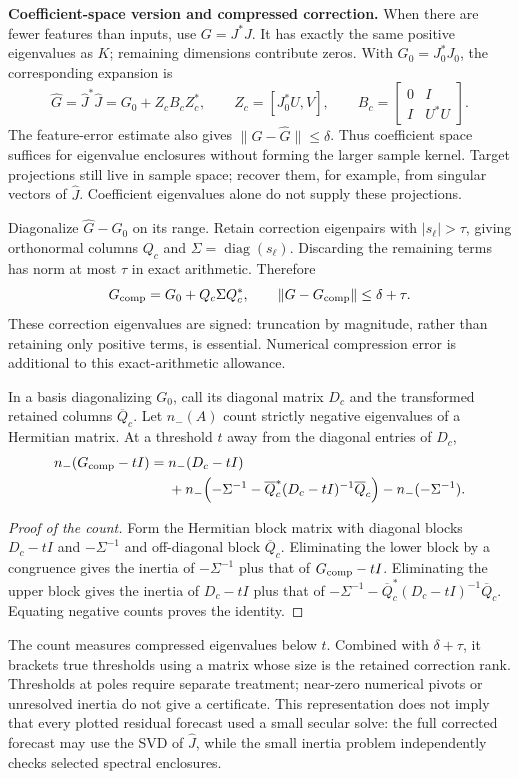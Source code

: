 \documentclass[11pt]{article}
\DeclareMathOperator{\diag}{diag}
\theoremstyle{definition}
\begin{document}
\textbf{Coefficient-space version and compressed correction.}
When there are fewer features than inputs, use $G=J^*J$. It has exactly
the same positive eigenvalues as $K$; remaining dimensions contribute zeros.
With $G_0=J_0^*J_0$, the corresponding expansion is
\[
\widehat G=\widehat J^*\widehat J=G_0+Z_cB_cZ_c^*,\qquad
Z_c=[J_0^*U,V],\qquad
B_c=\begin{bmatrix}0&I\\I&U^*U\end{bmatrix}.
\]
The feature-error estimate also gives $\|G-\widehat G\|\le\delta$.
Thus coefficient space suffices for eigenvalue enclosures without forming
the larger sample kernel. Target projections still live in sample space;
recover them, for example, from singular vectors of $\widehat J$.
Coefficient eigenvalues alone do not supply these projections.

Diagonalize $\widehat G-G_0$ on its range. Retain correction eigenpairs with
$|s_\ell|>\tau$, giving orthonormal columns $Q_c$ and
$\Sigma=\diag(s_\ell)$. Discarding the remaining terms has norm at most
$\tau$ in exact arithmetic. Therefore
\[
G_{\rm comp}=G_0+Q_c\Sigma Q_c^*,\qquad
\|G-G_{\rm comp}\|\le\delta+\tau.
\]
These correction eigenvalues are signed: truncation by magnitude, rather
than retaining only positive terms, is essential. Numerical compression
error is additional to this exact-arithmetic allowance.

In a basis diagonalizing $G_0$, call its diagonal matrix $D_c$ and the
transformed retained columns $\overline Q_c$. Let $n_-(A)$ count strictly
negative eigenvalues of a Hermitian matrix. At a threshold $t$ away from
the diagonal entries of $D_c$,
\begin{align*}
n_-(G_{\rm comp}-tI)
={}&n_-(D_c-tI)\\
&+n_-\!\left(-\Sigma^{-1}
-\overline Q_c^*(D_c-tI)^{-1}\overline Q_c\right)
-n_-(-\Sigma^{-1}).
\end{align*}
\begin{proof}[Proof of the count]
Form the Hermitian block matrix with diagonal blocks $D_c-tI$ and
$-\Sigma^{-1}$ and off-diagonal block $\overline Q_c$.
Eliminating the lower block by a congruence gives the inertia of
$-\Sigma^{-1}$ plus that of $G_{\rm comp}-tI$. Eliminating the upper block
gives the inertia of $D_c-tI$ plus that of
$-\Sigma^{-1}-\overline Q_c^*(D_c-tI)^{-1}\overline Q_c$.
Equating negative counts proves the identity.
\end{proof}
The count measures compressed eigenvalues below $t$. Combined with
$\delta+\tau$, it brackets true thresholds using a matrix whose size is
the retained correction rank. Thresholds at poles require separate
treatment; near-zero numerical pivots or unresolved inertia do not give
a certificate. This representation does not imply that every plotted
residual forecast used a small secular solve: the full corrected forecast
may use the SVD of $\widehat J$, while the small inertia problem independently
checks selected spectral enclosures.
\end{document}
